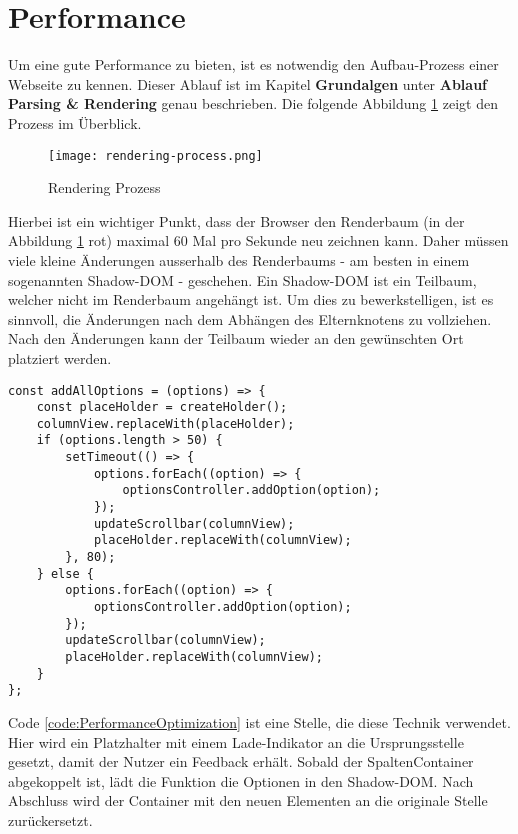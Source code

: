 \section{Performance}

Um eine gute Performance zu bieten, ist es notwendig den Aufbau-Prozess einer Webseite zu kennen.
Dieser Ablauf ist im Kapitel \textbf{Grundalgen} unter \textbf{Ablauf Parsing \& Rendering} genau beschrieben.
Die folgende Abbildung \ref{img:RenderingProcessRecap} zeigt den Prozess im Überblick.

\begin{figure}[!htb]
    \centering
    \texttt{[image: rendering-process.png]}
    \caption{Rendering Prozess}
    \label{img:RenderingProcessRecap}
\end{figure}

Hierbei ist ein wichtiger Punkt, dass der Browser den Renderbaum (in der Abbildung \ref{img:RenderingProcessRecap} rot) maximal 60 Mal pro Sekunde neu zeichnen kann.
Daher müssen viele kleine Änderungen ausserhalb des Renderbaums - am besten in einem sogenannten Shadow-DOM - geschehen.
Ein Shadow-DOM ist ein Teilbaum, welcher nicht im Renderbaum angehängt ist.
Um dies zu bewerkstelligen, ist es sinnvoll, die Änderungen nach dem Abhängen des Elternknotens zu vollziehen. 
Nach den Änderungen kann der Teilbaum wieder an den gewünschten Ort platziert werden.

\begin{lstlisting}[style = htmlcssjs, caption = Performance Optimierung (columnOptionsComponent.js), label = code:PerformanceOptimization]
const addAllOptions = (options) => {
    const placeHolder = createHolder();
    columnView.replaceWith(placeHolder);
    if (options.length > 50) {
        setTimeout(() => {
            options.forEach((option) => {
                optionsController.addOption(option);
            });
            updateScrollbar(columnView);
            placeHolder.replaceWith(columnView);
        }, 80);
    } else {
        options.forEach((option) => {
            optionsController.addOption(option);
        });
        updateScrollbar(columnView);
        placeHolder.replaceWith(columnView);
    }
};
\end{lstlisting}

Code \ref{code:PerformanceOptimization} ist eine Stelle, die diese Technik verwendet.
Hier wird ein Platzhalter mit einem Lade-Indikator an die Ursprungsstelle gesetzt, damit der Nutzer ein Feedback erhält.
Sobald der SpaltenContainer abgekoppelt ist, lädt die Funktion die Optionen in den Shadow-DOM.
Nach Abschluss wird der Container mit den neuen Elementen an die originale Stelle zurückersetzt.

